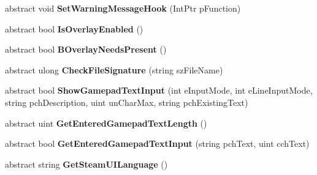 \begin{DoxyCompactItemize}
\mbox{\label{class_valve_1_1_steamworks_1_1_i_steam_utils_a806b59bf0a7c1c7fa03d40dbb92005e1}} 
abstract void {\bfseries Set\+Warning\+Message\+Hook} (Int\+Ptr p\+Function)
\item 
\mbox{\label{class_valve_1_1_steamworks_1_1_i_steam_utils_a41af6bffd359cedd6dccef4d8c467c15}} 
abstract bool {\bfseries Is\+Overlay\+Enabled} ()
\item 
\mbox{\label{class_valve_1_1_steamworks_1_1_i_steam_utils_a83019ac83f93dc0502c7ab02dedd3122}} 
abstract bool {\bfseries B\+Overlay\+Needs\+Present} ()
\item 
\mbox{\label{class_valve_1_1_steamworks_1_1_i_steam_utils_a132632a683e621a20ddca58d4453481c}} 
abstract ulong {\bfseries Check\+File\+Signature} (string sz\+File\+Name)
\item 
\mbox{\label{class_valve_1_1_steamworks_1_1_i_steam_utils_af3c2b968e3b0add15685f6a059196c05}} 
abstract bool {\bfseries Show\+Gamepad\+Text\+Input} (int e\+Input\+Mode, int e\+Line\+Input\+Mode, string pch\+Description, uint un\+Char\+Max, string pch\+Existing\+Text)
\item 
\mbox{\label{class_valve_1_1_steamworks_1_1_i_steam_utils_a32f6bdab024a937a430326670f9cc959}} 
abstract uint {\bfseries Get\+Entered\+Gamepad\+Text\+Length} ()
\item 
\mbox{\label{class_valve_1_1_steamworks_1_1_i_steam_utils_a384a26e2058a4c6c601b4242c1d37e37}} 
abstract bool {\bfseries Get\+Entered\+Gamepad\+Text\+Input} (string pch\+Text, uint cch\+Text)
\item 
\mbox{\label{class_valve_1_1_steamworks_1_1_i_steam_utils_aab08a9dafb2eaafc19756f499768eb55}} 
abstract string {\bfseries Get\+Steam\+U\+I\+Language} ()
\item 
\mbox{\label{class_valve_1_1_steamworks_1_1_i_steam_utils_a75be4590bdae3d262578a611a1a8430f}} 

\end{DoxyCompactItemize}
